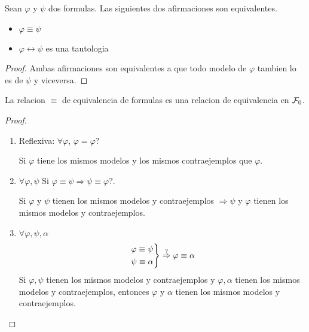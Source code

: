 \begin{proposition}
	Sean \(\varphi\) y \(\psi \) dos formulas. Las siguientes dos afirmaciones son equivalentes.
	\begin{itemize}
		\item \(\varphi \equiv \psi \)
		\item \(\varphi \leftrightarrow \psi \) es una tautologia
	\end{itemize}
\end{proposition}
\begin{proof}
	Ambas afirmaciones son equivalentes a que todo modelo de \(\varphi\) tambien lo es de \(\psi \) y viceversa.
\end{proof}
\begin{proposition}
	La relacion \(\equiv  \) de equivalencia de formulas es una relacion de equivalencia en \(\mathcal{\MakeUppercase{f}}_0 \).
\end{proposition}
\begin{proof}
	\begin{enumerate}
		\item Reflexiva: \(\forall \varphi\), \(\varphi = \varphi ? \)

		      Si \(\varphi\) tiene los mismos modelos y los mismos contraejemplos que \(\varphi\).

		\item \(\forall \varphi, \psi \) Si \(\varphi \equiv \psi \Rightarrow \psi \equiv \varphi ? \).

		      Si \(\varphi \) y \(\psi \) tienen los mismos modelos y contraejemplos \(\Rightarrow \psi \) y \(\varphi\) tienen los mismos modelos y contraejemplos.

		\item \(\forall \varphi, \psi, \alpha\)
		      \[
			      \begin{rcases}
				      \varphi \equiv \psi \\
				      \psi \equiv \alpha
			      \end{rcases} \overset{?}{\Rightarrow} \varphi \equiv \alpha
		      \]
		      Si \(\varphi, \psi \) tienen los mismos modelos y contraejemplos y \(\varphi, \alpha\) tienen los mismos modelos y contraejemplos, entonces \(\varphi\) y \(\alpha\) tienen los mismos modelos y contraejemplos.
	\end{enumerate}
\end{proof}

